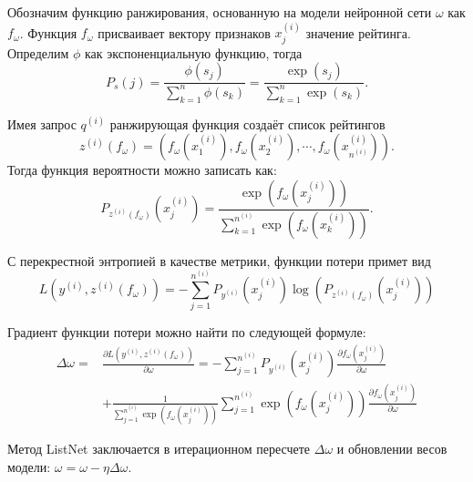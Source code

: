Обозначим функцию ранжирования, основанную на модели нейронной сети $\omega$ как $f_\omega$. Функция $f_\omega$ присваивает вектору признаков $x_j^{(i)}$ значение рейтинга. Определим $\phi$ как экспоненциальную функцию, тогда
\[
P_s(j)=\frac{\phi(s_j)}{\sum_{k=1}^n \phi(s_k)}=\frac{\exp (s_j)}{\sum_{k=1}^n \exp (s_k)}.
\]

Имея запрос $q^{(i)}$ ранжирующая функция создаёт список рейтингов \[z^{(i)}(f_\omega)=(f_\omega(x_1^{(i)}), f_\omega(x_2^{(i)}), \cdots, f_\omega(x_{n^{(i)}}^{(i)})).
\]
Тогда функция вероятности можно записать как:
\[
P_{z^{(i)}(f_\omega)}(x_j^{(i)})=\frac{\exp (f_\omega(x_j^{(i)}))}{\sum_{k=1}^{n^{(i)}} \exp (f_\omega(x_k^{(i)}))}.
\]

С перекрестной энтропией в качестве метрики, функции потери примет вид
\[
L(y^{(i)}, z^{(i)}(f_\omega))=-\sum_{j=1}^{n^{(i)}} P_{y^{(i)}}(x_j^{(i)}) \log (P_{z^{(i)}(f_\omega)}(x_j^{(i)}))
\]

Градиент функции потери можно найти по следующей формуле:
\[
\begin{aligned}
	\Delta \omega= & \frac{\partial L(y^{(i)}, z^{(i)}(f_\omega))}{\partial \omega}=-\sum_{j=1}^{n^{(i)}} P_{y^{(i)}}(x_j^{(i)}) \frac{\partial f_\omega(x_j^{(i)})}{\partial \omega} \\
	& +\frac{1}{\sum_{j=1}^{n^{(i)}} \exp (f_\omega(x_j^{(i)}))} \sum_{j=1}^{n^{(i)}} \exp (f_\omega(x_j^{(i)})) \frac{\partial f_\omega(x_j^{(i)})}{\partial \omega}
\end{aligned}
\]

Метод ListNet заключается в итерационном пересчете $\Delta \omega$ и обновлении весов
модели: $\omega = \omega - \eta\Delta \omega$.